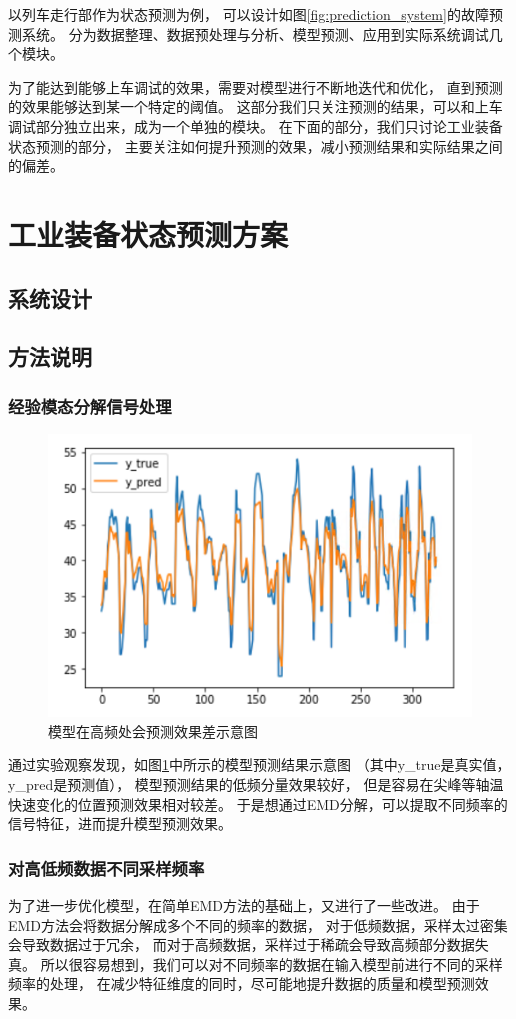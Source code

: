以列车走行部作为状态预测为例，
可以设计如图\ref{fig:prediction_system}的故障预测系统。
分为数据整理、数据预处理与分析、模型预测、应用到实际系统调试几个模块。

为了能达到能够上车调试的效果，需要对模型进行不断地迭代和优化，
直到预测的效果能够达到某一个特定的阈值。
这部分我们只关注预测的结果，可以和上车调试部分独立出来，成为一个单独的模块。
在下面的部分，我们只讨论工业装备状态预测的部分，
主要关注如何提升预测的效果，减小预测结果和实际结果之间的偏差。

\section{工业装备状态预测方案}
\subsection{系统设计}
\subsection{方法说明}
\subsubsection{经验模态分解信号处理}
  \begin{figure}
    \centering
    \includegraphics[width=0.8\linewidth]{figures/EMD动机.png}
    \caption{模型在高频处会预测效果差示意图}
    \label{fig:EMD motivation}
  \end{figure}
  通过实验观察发现，如图\ref{fig:EMD motivation}中所示的模型预测结果示意图
  （其中y\_true是真实值，y\_pred是预测值），
  模型预测结果的低频分量效果较好，
  但是容易在尖峰等轴温快速变化的位置预测效果相对较差。
  于是想通过EMD分解，可以提取不同频率的信号特征，进而提升模型预测效果。
\subsubsection{对高低频数据不同采样频率}
  为了进一步优化模型，在简单EMD方法的基础上，又进行了一些改进。
  由于EMD方法会将数据分解成多个不同的频率的数据，
  对于低频数据，采样太过密集会导致数据过于冗余，
  而对于高频数据，采样过于稀疏会导致高频部分数据失真。
  所以很容易想到，我们可以对不同频率的数据在输入模型前进行不同的采样频率的处理，
  在减少特征维度的同时，尽可能地提升数据的质量和模型预测效果。

